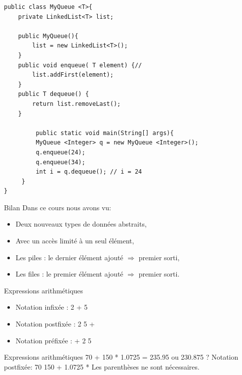 \documentclass[12pt,a4paper]{beamer}
\begin{document}
\begin{frame}[fragile]
\begin{lstlisting}
public class MyQueue <T>{
    private LinkedList<T> list;

    public MyQueue(){
        list = new LinkedList<T>();
    }
    public void enqueue( T element) {//
        list.addFirst(element);
    }
    public T dequeue() {
        return list.removeLast();
    }   
  
         public static void main(String[] args){
         MyQueue <Integer> q = new MyQueue <Integer>();
         q.enqueue(24);
         q.enqueue(34);
         int i = q.dequeue(); // i = 24
     }
}
\end{lstlisting}

\end{frame}

\begin{frame}{Bilan}
Dans ce cours nous avons vu:
\begin{itemize}
\item Deux nouveaux types de données abstraits,
\item Avec un accès limité à un seul élément,
\item Les piles : le dernier élément ajouté $\Rightarrow$ premier sorti,
\item Les files : le premier élément ajouté $\Rightarrow$ premier sorti.
\end{itemize}
\end{frame}

\begin{frame}{Expressions arithmétiques}
 \begin{itemize}
 \item Notation infixée : 2 + 5
 \item Notation postfixée : 2 5 +
 \item Notation préfixée : + 2 5 
 \end{itemize}

\end{frame}

\begin{frame}{Expressions arithmétiques}
70 + 150 * 1.0725 =  235.95 ou 230.875 ?
\newline
\pause
Notation postfixée: 70  150 + 1.0725 *\newline
\pause Les parenthèses ne sont nécessaires.

\end{frame}
\end{document}
